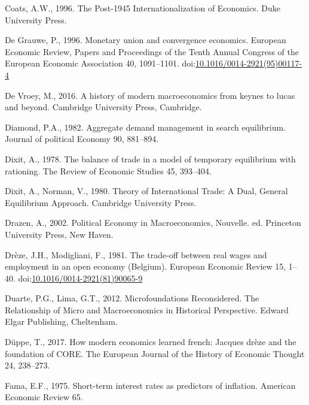 \documentclass[]{elsarticle} %
\newlength{\cslhangindent}
\newlength{\cslentryspacingunit} %
\newenvironment{CSLReferences}[2] %
 {%
  \setlength{\parindent}{0pt}
  \ifodd #1
  \let\oldpar\par
  \def\par{\hangindent=\cslhangindent\oldpar}
  \fi
  \setlength{\parskip}{#2\cslentryspacingunit}
 }%
 {}
\begin{document}
\begin{CSLReferences}{1}{0}
\leavevmode{}%
Coats, A.W., 1996. The Post-1945 Internationalization of Economics. Duke
University Press.

\leavevmode{}%
De Grauwe, P., 1996. Monetary union and convergence economics. European
Economic Review, Papers and {Proceedings} of the {Tenth Annual Congress}
of the {European Economic Association} 40, 1091--1101.
doi:\href{https://doi.org/10.1016/0014-2921(95)00117-4}{10.1016/0014-2921(95)00117-4}

\leavevmode{}%
De Vroey, M., 2016. A history of modern macroeconomics from keynes to
lucas and beyond. Cambridge University Press, Cambridge.

\leavevmode{}%
Diamond, P.A., 1982. Aggregate demand management in search equilibrium.
Journal of political Economy 90, 881--894.

\leavevmode{}%
Dixit, A., 1978. The balance of trade in a model of temporary
equilibrium with rationing. The Review of Economic Studies 45, 393--404.

\leavevmode{}%
Dixit, A., Norman, V., 1980. Theory of {International Trade}: {A Dual},
{General Equilibrium Approach}. {Cambridge University Press}.

\leavevmode{}%
Drazen, A., 2002. Political {Economy} in {Macroeconomics}, Nouvelle. ed.
{Princeton University Press}, {New Haven}.

\leavevmode{}%
Drèze, J.H., Modigliani, F., 1981. The trade-off between real wages and
employment in an open economy ({Belgium}). European Economic Review 15,
1--40.
doi:\href{https://doi.org/10.1016/0014-2921(81)90065-9}{10.1016/0014-2921(81)90065-9}

\leavevmode{}%
Duarte, P.G., Lima, G.T., 2012. Microfoundations {Reconsidered}. {The
Relationship} of {Micro} and {Macroeconomics} in {Historical
Perspective}. {Edward Elgar Publishing}, {Cheltenham}.

\leavevmode{}%
Düppe, T., 2017. How modern economics learned french: Jacques drèze and
the foundation of CORE. The European Journal of the History of Economic
Thought 24, 238--273.

\leavevmode{}%
Fama, E.F., 1975. Short-term interest rates as predictors of inflation.
American Economic Review 65.


\end{CSLReferences}
\end{document}
